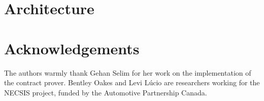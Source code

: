 \documentclass[conference]{IEEEtran}
\begin{document}
\section{Architecture}
\label{sec:arch}

%
%
%
%
%
%
%
%
%
%

\section*{Acknowledgements}
The authors warmly thank Gehan Selim for her work on the
implementation of the contract prover. Bentley Oakes and Levi L\'ucio are
researchers working for the NECSIS project, funded by the Automotive Partnership
Canada. %



\end{document}
